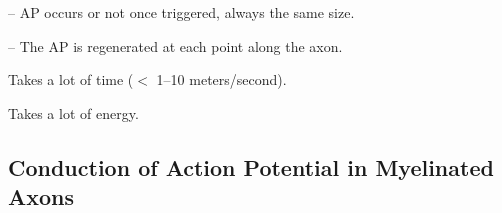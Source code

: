 \begin{coloredlist}
    \item {} -- AP occurs or not once triggered, always the same size.
    \item {} -- The AP is regenerated at each point along the axon.
    \begin{coloredlist}
        \item Takes a lot of time (\(<\) 1--10 meters/second).
        \item Takes a lot of energy.
    \end{coloredlist}
\end{coloredlist}

\subsection{Conduction of Action Potential in Myelinated Axons}

